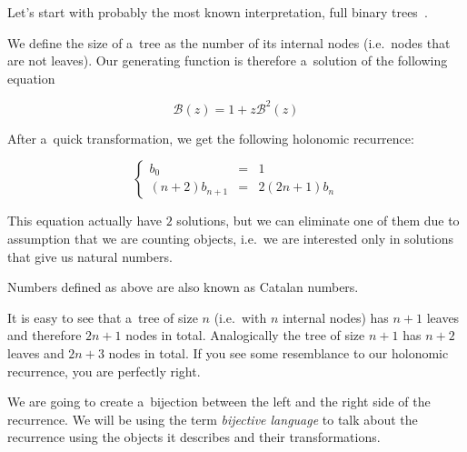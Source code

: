 \documentclass[final]{article}
\theoremstyle{definition}
\theoremstyle{definition}
\theoremstyle{remark}
\newcommand{\gf}[1]{\ensuremath{\mathcal{#1}}}
\begin{document}
Let's start with probably the most known interpretation, full binary trees~\cite{binary}.

We define the size of a~tree as the number of its internal nodes (i.e.~nodes that are not leaves). Our generating function is therefore a~solution of the following equation

\[\gf{B}(z) = 1 + z\gf{B}^2(z)\]

After a~quick transformation, we get the following holonomic recurrence:

\[\left\{\begin{array}{rcl}
            b_0 &=& 1\\
            (n + 2)b_{n + 1} &=& 2 (2n + 1)b_n
\end{array}\right.\]

This equation actually have \(2\) solutions, but we can eliminate one of them due to assumption that we are counting objects, i.e.~we are interested only in solutions that give us natural numbers.

Numbers defined as above are also known as Catalan numbers.

It is easy to see that a~tree of size \(n\) (i.e.~with \(n\) internal nodes) has \(n + 1\) leaves and therefore \(2n + 1\) nodes in total. Analogically the tree of size \(n + 1\) has \(n + 2\) leaves and \(2n + 3\) nodes in total. If you see some resemblance to our holonomic recurrence, you are perfectly right.

We are going to create a~bijection between the left and the right side of the recurrence. We will be using the term \textit{bijective language} to talk about the recurrence using the objects it describes and their transformations.
\end{document}
